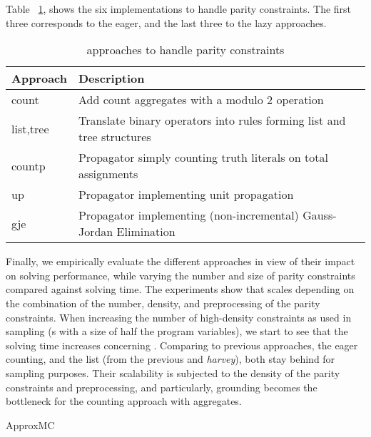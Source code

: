 \documentclass[letterpaper]{article} %
\begin{document}
 Table~ \ref{table:xorro_approaches}, shows the six implementations to handle parity constraints.
 The first three corresponds to the eager, and the last three to the lazy approaches. 
 
 \begin{table}
 	\begin{tabular}{ l|l }
 		Approach  & Description  \\
 		\hline\hline
 		count     & Add count aggregates with a modulo 2 operation  \\  
 		list,tree & Translate binary \XOR{} operators into rules forming list and tree structures \\
 		countp    & Propagator simply counting truth literals on total assignments\\
 		up        & Propagator implementing unit propagation\\
 		gje       & Propagator implementing (non-incremental) Gauss-Jordan Elimination
 		
 	\end{tabular}
 	\caption{\xorro{} approaches to handle parity constraints}\label{table:xorro_approaches}
 	\vspace{-7mm}
 \end{table}
 Finally, we empirically evaluate the different approaches in view of their impact on solving performance,
 while varying the number and size of parity constraints compared against \clingo{} solving time.
 The experiments show that \xorro{} scales depending on the combination of the number, density, and preprocessing of the parity constraints.
 When increasing the number of high-density constraints as used in sampling (\XOR{}s with a size of half the program variables), we start to see that the solving time increases concerning \clingo.
 Comparing to previous approaches, the eager counting, and the list (from the previous \xorro{} and \emph{harvey}), both stay behind for sampling purposes. Their scalability is subjected to the density of the parity constraints and preprocessing, and particularly, grounding becomes the bottleneck for the counting approach with aggregates.
 
 

ApproxMC~\cite{DBLP:conf/cp/ChakrabortyMV13}




\end{document}
